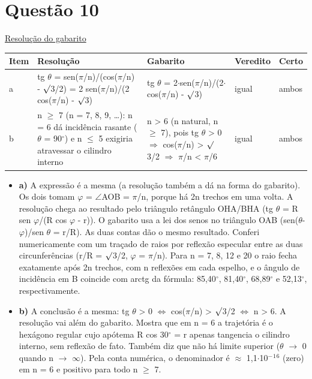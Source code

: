 \documentclass{article}%
\begin{document}
\section*{Questão 10}%
\href{https://poliedroresolve.sistemapoliedro.com.br/vestibulares/ime/2026/ime-2-fase-dia-2-24-10-2025-2-fase-dia-2/dissertativa-10-fisica-2-fase-dia-2-ime-2026}{Resolução do gabarito}\par\smallskip%
\begin{longtable}{@{}p{} p{} p{} p{} p{}@{}}\toprule Item & Resolução & Gabarito & Veredito & Certo \\ \midrule
a & tg $\theta$ = sen($\pi$/n)/(cos($\pi$/n) - $\surd$3/2) = 2 sen($\pi$/n)/(2 cos($\pi$/n) - $\surd$3) & tg $\theta$ = 2$\cdot$sen($\pi$/n)/(2$\cdot$cos($\pi$/n) - $\surd$3) & igual & ambos \\
b & n $\geq$ 7 (n = 7, 8, 9, \ldots{}): n = 6 dá incidência rasante ($\theta$ = 90$^\circ$) e n $\leq$ 5 exigiria atravessar o cilindro interno & n > 6 (n natural, n $\geq$ 7), pois tg $\theta$ > 0 $\Rightarrow$ cos($\pi$/n) > $\surd$3/2 $\Rightarrow$ $\pi$/n < $\pi$/6 & igual & ambos \\
\bottomrule\end{longtable}%
\begin{itemize}%
\item%
\textbf{a)} A expressão é a mesma (a resolução também a dá na forma do gabarito). Os dois tomam $\varphi$ = $\angle$AOB = $\pi$/n, porque há 2n trechos em uma volta. A resolução chega ao resultado pelo triângulo retângulo OHA/BHA (tg $\theta$ = R sen $\varphi$/(R cos $\varphi$ - r)). O gabarito usa a lei dos senos no triângulo OAB (sen($\theta$-$\varphi$)/sen $\theta$ = r/R). As duas contas dão o mesmo resultado. Conferi numericamente com um traçado de raios por reflexão especular entre as duas circunferências (r/R = $\surd$3/2, $\varphi$ = $\pi$/n). Para n = 7, 8, 12 e 20 o raio fecha exatamente após 2n trechos, com n reflexões em cada espelho, e o ângulo de incidência em B coincide com arctg da fórmula: 85,40$^\circ$, 81,40$^\circ$, 68,89$^\circ$ e 52,13$^\circ$, respectivamente.%
\item%
\textbf{b)} A conclusão é a mesma: tg $\theta$ > 0 $\Leftrightarrow$ cos($\pi$/n) > $\surd$3/2 $\Leftrightarrow$ n > 6. A resolução vai além do gabarito. Mostra que em n = 6 a trajetória é o hexágono regular cujo apótema R cos 30$^\circ$ = r apenas tangencia o cilindro interno, sem reflexão de fato. Também diz que não há limite superior ($\theta$ $\to$ 0 quando n $\to$ $\infty$). Pela conta numérica, o denominador é $\approx$ 1,1$\cdot$10$^{-}$$^{1}$$^{6}$ (zero) em n = 6 e positivo para todo n $\geq$ 7.%
\end{itemize}%
\end{document}
